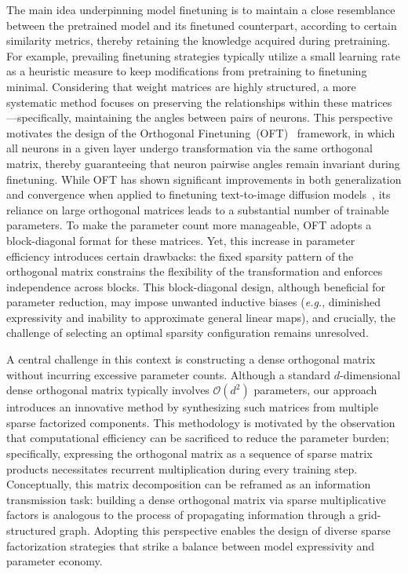 The main idea underpinning model finetuning is to maintain a close resemblance between the pretrained model and its finetuned counterpart, according to certain similarity metrics, thereby retaining the knowledge acquired during pretraining. For example, prevailing finetuning strategies typically utilize a small learning rate as a heuristic measure to keep modifications from pretraining to finetuning minimal. Considering that weight matrices are highly structured, a more systematic method focuses on preserving the relationships within these matrices—specifically, maintaining the angles between pairs of neurons. This perspective motivates the design of the Orthogonal Finetuning~(OFT)~\cite{qiu2023controlling} framework, in which all neurons in a given layer undergo transformation via the same orthogonal matrix, thereby guaranteeing that neuron pairwise angles remain invariant during finetuning. While OFT has shown significant improvements in both generalization and convergence when applied to finetuning text-to-image diffusion models~\cite{qiu2023controlling}, its reliance on large orthogonal matrices leads to a substantial number of trainable parameters. To make the parameter count more manageable, OFT adopts a block-diagonal format for these matrices. Yet, this increase in parameter efficiency introduces certain drawbacks: the fixed sparsity pattern of the orthogonal matrix constrains the flexibility of the transformation and enforces independence across blocks. This block-diagonal design, although beneficial for parameter reduction, may impose unwanted inductive biases (\emph{e.g.}, diminished expressivity and inability to approximate general linear maps), and crucially, the challenge of selecting an optimal sparsity configuration remains unresolved.

A central challenge in this context is constructing a dense orthogonal matrix without incurring excessive parameter counts. Although a standard $d$-dimensional dense orthogonal matrix typically involves $\mathcal{O}(d^2)$ parameters, our approach introduces an innovative method by synthesizing such matrices from multiple sparse factorized components. This methodology is motivated by the observation that computational efficiency can be sacrificed to reduce the parameter burden; specifically, expressing the orthogonal matrix as a sequence of sparse matrix products necessitates recurrent multiplication during every training step. Conceptually, this matrix decomposition can be reframed as an information transmission task: building a dense orthogonal matrix via sparse multiplicative factors is analogous to the process of propagating information through a grid-structured graph. Adopting this perspective enables the design of diverse sparse factorization strategies that strike a balance between model expressivity and parameter economy.

